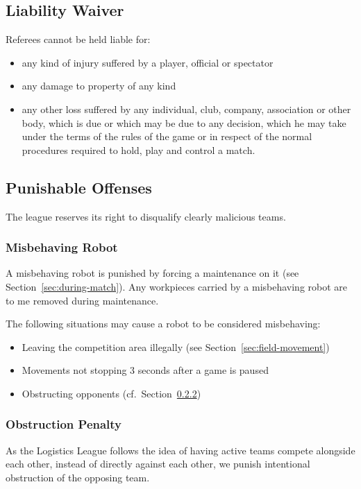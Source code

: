 \documentclass[12pt,twoside]{article}
\newcommand{\refsec}[1]{Section~\ref{#1}}
\begin{document}
\subsection{Liability Waiver}
Referees cannot be held liable for:
\begin{itemize}
\item any kind of injury suffered by a player, official or spectator
\item any damage to property of any kind
\item any other loss suffered by any individual, club, company,
  association or other body, which is due or which may be due to any
  decision, which he may take under the terms of the rules of the game
  or in respect of the normal procedures required to hold, play and
  control a match.
\end{itemize}

\subsection{Punishable Offenses}
The league reserves its right to disqualify clearly malicious teams.

\subsubsection{Misbehaving Robot}
\label{sec:misbehaving-robot}
A misbehaving robot is punished by forcing a maintenance on it (see
\refsec{sec:during-match}).
Any workpieces carried by a misbehaving robot are to me removed during
maintenance.

The following situations may cause a robot to be considered misbehaving:
\begin{itemize}
  \item Leaving the competition area illegally (see \refsec{sec:field-movement})
  \item Movements not stopping 3 seconds after a game is paused
  \item Obstructing opponents (cf.~\refsec{sec:obstruction-penalty})
\end{itemize}

\subsubsection{Obstruction Penalty}
\label{sec:obstruction-penalty}

As the Logistics League follows the idea of having active teams
compete alongside each other, instead of directly against each other, we
punish intentional obstruction of the opposing team.
\end{document}

